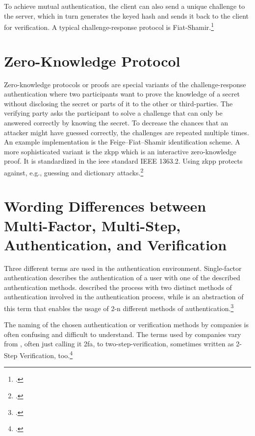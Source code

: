 To achieve mutual authentication, the client can also send a unique challenge to the server, which in turn generates the keyed hash and sends it back to the client for verification. A typical challenge-response protocol is Fiat-Shamir.\footcites[See][Chapter 13.6]{waschke2017personal}[See][489--491]{eckert-it-sec-9}

\section{Zero-Knowledge Protocol}

Zero-knowledge protocols or proofs are special variants of the challenge-response authentication where two participants want to prove the knowledge of a secret without disclosing the secret or parts of it to the other or third-parties. The verifying party asks the participant to solve a challenge that can only be answered correctly by knowing the secret. To decrease the chances that an attacker might have guessed correctly, the challenges are repeated multiple times. An example implementation is the Feige–Fiat–Shamir identification scheme. A more sophisticated variant is the \gls{zkpp} which is an interactive zero-knowledge proof. It is standardized in the \gls{ieee} standard IEEE 1363.2. Using \gls{zkpp} protects against, e.g., guessing and dictionary attacks.\footcites[See][492]{eckert-it-sec-9}[See][Chapter 28.3.7]{1174011}[See][769--770]{FISCHERHBNER2017759}[See][]{Feige1988}

\section{Wording Differences between Multi-Factor, Multi-Step, Authentication, and Verification}

Three different terms are used in the authentication environment. Single-factor authentication describes the authentication of a user with one of the described authentication methods.  described the process with two distinct methods of authentication involved in the authentication process, while  is an abstraction of this term that enables the usage of 2-n different methods of authentication.\footcites[See][186--188]{dasgupta2017multi}

The naming of the chosen authentication or verification methods by companies is often confusing and difficult to understand. The terms used by companies vary from , often just calling it \gls{2fa}, to two-step-verification, sometimes written as 2-Step Verification, too.\footcites[See][]{apple_2fa}[See][]{apple_s2v}[See][]{playstation}[See][]{google_2-step_verification}[See][]{microsoft_2sv}

